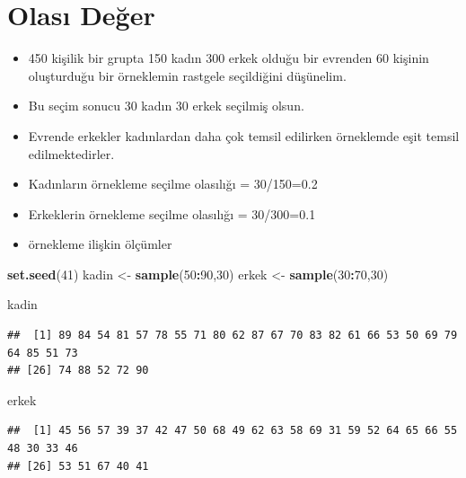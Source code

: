 \documentclass[
  oneside]{book}
\newenvironment{Shaded}{\begin{snugshade}}{\end{snugshade}}
\newcommand{\DecValTok}[1]{\textcolor[rgb]{0.00,0.00,0.81}{#1}}
\newcommand{\FunctionTok}[1]{\textcolor[rgb]{0.13,0.29,0.53}{\textbf{#1}}}
\newcommand{\NormalTok}[1]{#1}
\newcommand{\OtherTok}[1]{\textcolor[rgb]{0.56,0.35,0.01}{#1}}
\newcommand{\SpecialCharTok}[1]{\textcolor[rgb]{0.81,0.36,0.00}{\textbf{#1}}}
\begin{document}
\hypertarget{olasux131-deux11fer}{%
\section{Olası Değer}\label{olasux131-deux11fer}}

\begin{itemize}
\item
  450 kişilik bir grupta 150 kadın 300 erkek olduğu bir evrenden 60 kişinin oluşturduğu bir örneklemin rastgele seçildiğini düşünelim.
\item
  Bu seçim sonucu 30 kadın 30 erkek seçilmiş olsun.
\item
  Evrende erkekler kadınlardan daha çok temsil edilirken örneklemde eşit temsil edilmektedirler.
\item
  Kadınların örnekleme seçilme olasılığı = 30/150=0.2
\item
  Erkeklerin örnekleme seçilme olasılığı = 30/300=0.1
\item
  örnekleme ilişkin ölçümler
\end{itemize}

\begin{Shaded}
\begin{Highlighting}[]
\FunctionTok{set.seed}\NormalTok{(}\DecValTok{41}\NormalTok{)}
\NormalTok{kadin }\OtherTok{\textless{}{-}} \FunctionTok{sample}\NormalTok{(}\DecValTok{50}\SpecialCharTok{:}\DecValTok{90}\NormalTok{,}\DecValTok{30}\NormalTok{)}
\NormalTok{erkek }\OtherTok{\textless{}{-}} \FunctionTok{sample}\NormalTok{(}\DecValTok{30}\SpecialCharTok{:}\DecValTok{70}\NormalTok{,}\DecValTok{30}\NormalTok{)}

\NormalTok{kadin}
\end{Highlighting}
\end{Shaded}

\begin{verbatim}
##  [1] 89 84 54 81 57 78 55 71 80 62 87 67 70 83 82 61 66 53 50 69 79 64 85 51 73
## [26] 74 88 52 72 90
\end{verbatim}

\begin{Shaded}
\begin{Highlighting}[]
\NormalTok{erkek}
\end{Highlighting}
\end{Shaded}

\begin{verbatim}
##  [1] 45 56 57 39 37 42 47 50 68 49 62 63 58 69 31 59 52 64 65 66 55 48 30 33 46
## [26] 53 51 67 40 41
\end{verbatim}
\end{document}

